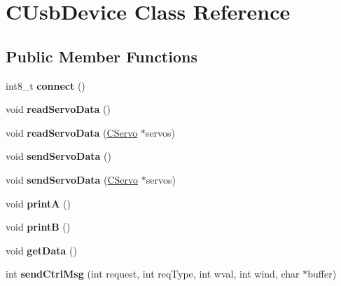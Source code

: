\hypertarget{class_c_usb_device}{
\section{CUsbDevice Class Reference}
\label{class_c_usb_device}
}
\subsection*{Public Member Functions}
\begin{DoxyCompactItemize}
\item 
\hypertarget{class_c_usb_device_a7d0f11d555238876562b24ea1e39ec0c}{
int8\_\-t {\bfseries connect} ()}
\label{class_c_usb_device_a7d0f11d555238876562b24ea1e39ec0c}

\item 
\hypertarget{class_c_usb_device_a9f9e12007fa75353ce55fd85816797ab}{
void {\bfseries readServoData} ()}
\label{class_c_usb_device_a9f9e12007fa75353ce55fd85816797ab}

\item 
\hypertarget{class_c_usb_device_a15983315244b83b8aa434260f49836e7}{
void {\bfseries readServoData} (\hyperlink{class_c_servo}{CServo} $\ast$servos)}
\label{class_c_usb_device_a15983315244b83b8aa434260f49836e7}

\item 
\hypertarget{class_c_usb_device_a77de8285f37ac6d8c8fe1ebb3246e6be}{
void {\bfseries sendServoData} ()}
\label{class_c_usb_device_a77de8285f37ac6d8c8fe1ebb3246e6be}

\item 
\hypertarget{class_c_usb_device_ad8450d3e6da6bf6a0aa4187c298389d3}{
void {\bfseries sendServoData} (\hyperlink{class_c_servo}{CServo} $\ast$servos)}
\label{class_c_usb_device_ad8450d3e6da6bf6a0aa4187c298389d3}

\item 
\hypertarget{class_c_usb_device_a129cb84b58cfdb272536fe4ab98f3998}{
void {\bfseries printA} ()}
\label{class_c_usb_device_a129cb84b58cfdb272536fe4ab98f3998}

\item 
\hypertarget{class_c_usb_device_aefc74a375701e6300d9bbb7399b645a6}{
void {\bfseries printB} ()}
\label{class_c_usb_device_aefc74a375701e6300d9bbb7399b645a6}

\item 
\hypertarget{class_c_usb_device_a1677e807377057bc3f29f383a1c1afd2}{
void {\bfseries getData} ()}
\label{class_c_usb_device_a1677e807377057bc3f29f383a1c1afd2}

\item 
\hypertarget{class_c_usb_device_ab6b13421bf961840c5c0e8fdd7f65c60}{
int {\bfseries sendCtrlMsg} (int request, int reqType, int wval, int wind, char $\ast$buffer)}
\label{class_c_usb_device_ab6b13421bf961840c5c0e8fdd7f65c60}

\end{DoxyCompactItemize}

